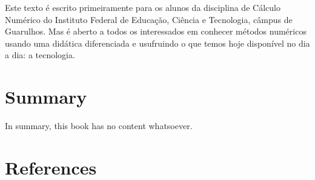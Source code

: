 \documentclass[
  letterpaper,
  DIV=11,
  numbers=noendperiod]{scrreprt}
\newlength{\cslhangindent}
\newenvironment{CSLReferences}[2] %
 {\begin{list}{}{%
  \setlength{\itemindent}{0pt}
  \setlength{\leftmargin}{0pt}
  \setlength{\parsep}{0pt}
  \ifodd #1
   \setlength{\leftmargin}{\cslhangindent}
   \setlength{\itemindent}{-1\cslhangindent}
  \fi
  \setlength{\itemsep}{#2\baselineskip}}}
 {\end{list}}
\begin{document}
Este texto é escrito primeiramente para os alunos da disciplina de
Cálculo Numérico do Instituto Federal de Educação, Ciência e Tecnologia,
câmpus de Guarulhos. Mas é aberto a todos os interessados em conhecer
métodos numéricos usando uma didática diferenciada e usufruindo o que
temos hoje disponível no dia a dia: a tecnologia.


\chapter{Summary}\label{summary}

In summary, this book has no content whatsoever.


\chapter*{References}\label{references}


\label{refs}
\begin{CSLReferences}{0}{1}
\end{CSLReferences}
\end{document}
